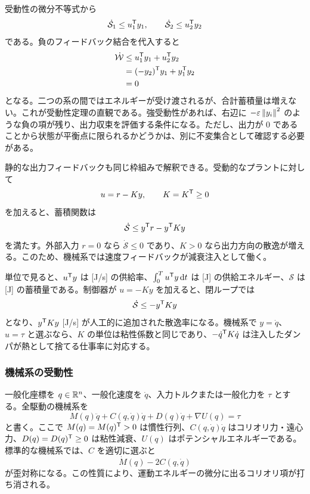 \begin{derivation}
受動性の微分不等式から
\begin{equation}
  \dot{\mathcal{S}}_1\le u_1^{\mathsf{T}} y_1,\qquad
  \dot{\mathcal{S}}_2\le u_2^{\mathsf{T}} y_2
\end{equation}
である。負のフィードバック結合を代入すると
\begin{align}
  \dot{\mathcal{W}}
  &\le u_1^{\mathsf{T}} y_1+u_2^{\mathsf{T}} y_2\\
  &=(-y_2)^{\mathsf{T}} y_1+y_1^{\mathsf{T}} y_2\\
  &=0
\end{align}
となる。二つの系の間ではエネルギーが受け渡されるが、合計蓄積量は増えない。これが受動性定理の直観である。強受動性があれば、右辺に $-\varepsilon\left\|y_i\right\|^2$ のような負の項が残り、出力収束を評価する条件になる。ただし、出力が 0 であることから状態が平衡点に限られるかどうかは、別に不変集合として確認する必要がある。
\end{derivation}

静的な出力フィードバックも同じ枠組みで解釈できる。受動的なプラントに対して
\begin{equation}
  u=r-Ky,\qquad K=K^{\mathsf{T}} \ge0
\end{equation}
を加えると、蓄積関数は
\begin{equation}
  \dot{\mathcal{S}}\le y^{\mathsf{T}} r-y^{\mathsf{T}} Ky
\end{equation}
を満たす。外部入力 $r=0$ なら $\dot{\mathcal{S}}\le0$ であり、$K>0$ なら出力方向の散逸が増える。このため、機械系では速度フィードバックが減衰注入として働く。

単位で見ると、$u^{\mathsf{T}} y$ は [J/s] の供給率、$\int_0^T u^{\mathsf{T}} y\,\mathrm{d} t$ は [J] の供給エネルギー、$\mathcal{S}$ は [J] の蓄積量である。制御器が $u=-Ky$ を加えると、閉ループでは
\begin{equation}
  \dot{\mathcal{S}}\le -y^{\mathsf{T}} Ky
\end{equation}
となり、$y^{\mathsf{T}} Ky$ [J/s] が人工的に追加された散逸率になる。機械系で $y=\dot{q}$、$u=\tau$ と選ぶなら、$K$ の単位は粘性係数と同じであり、$-\dot{q}^{\mathsf{T}} K\dot{q}$ は注入したダンパが熱として捨てる仕事率に対応する。

\subsubsection{機械系の受動性}

一般化座標を $q\in\mathbb{R}^n$、一般化速度を $\dot{q}$、入力トルクまたは一般化力を $\tau$ とする。全駆動の機械系を
\begin{equation}
  M(q)\ddot{q}+C(q,\dot{q})\dot{q}+D(q)\dot{q}+\nabla U(q)=\tau
\end{equation}
と書く。ここで $M(q)=M(q)^{\mathsf{T}}>0$ は慣性行列、$C(q,\dot{q})\dot{q}$ はコリオリ力・遠心力、$D(q)=D(q)^{\mathsf{T}} \ge0$ は粘性減衰、$U(q)$ はポテンシャルエネルギーである。標準的な機械系では、$C$ を適切に選ぶと
\begin{equation}
  \dot{M}(q)-2C(q,\dot{q})
\end{equation}
が歪対称になる。この性質により、運動エネルギーの微分に出るコリオリ項が打ち消される。

